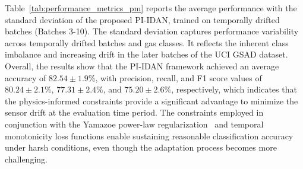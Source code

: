 \documentclass{IEEE_lsens}
\begin{document}

Table~\ref{tab:performance_metrics_pm} reports the average performance with the standard deviation of the proposed PI-IDAN, trained on temporally drifted batches (Batches 3-10). The standard deviation captures performance variability across temporally drifted batches and gas classes. It reflects the inherent class imbalance and increasing drift in the later batches of the UCI GSAD dataset.
Overall, the results show that the PI-IDAN framework achieved an average accuracy of $\mathrm{82.54 \pm 1.9}$\%, with precision, recall, and F1 score values of $\mathrm{80.24 \pm 2.1}$\%, $\mathrm{77.31 \pm 2.4}\%$, and $\mathrm{75.20 \pm 2.6}\%$, respectively, which indicates that the physics-informed constraints provide a significant advantage to minimize the sensor drift at the evaluation time period. The constraints employed in conjunction with the Yamazoe power-law regularization~\cite{hua2018theoretical} and temporal monotonicity loss functions enable sustaining reasonable classification accuracy under harsh conditions, even though the adaptation process becomes more challenging.
\end{document}
